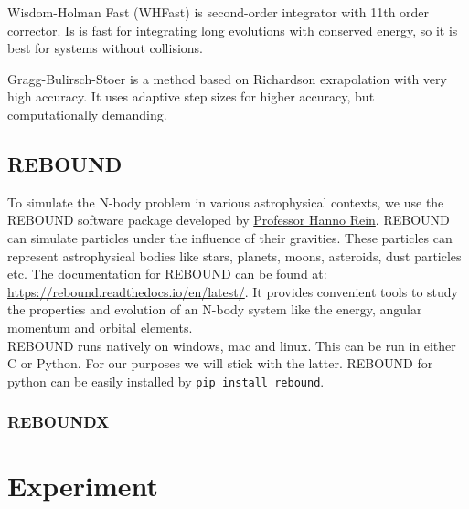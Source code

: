 \documentclass[12pt,a4paper]{article}
\begin{document}
Wisdom-Holman Fast (WHFast) is second-order integrator with 11th order corrector. Is is fast for integrating long evolutions with conserved energy, so it is best for systems without collisions.

Gragg-Bulirsch-Stoer is a method based on Richardson exrapolation with very high accuracy. It uses adaptive step sizes for higher accuracy, but computationally demanding.


\subsection{REBOUND}
To simulate the N-body problem in various astrophysical contexts, we use the REBOUND software package developed by \href{https://hanno-rein.de/}{ Professor Hanno Rein}. 
REBOUND can simulate particles under the influence of their gravities. These particles can represent astrophysical bodies like stars, planets, moons, asteroids, dust particles etc\cite{rebound}. 
The documentation for REBOUND can be found at: \href{https://rebound.readthedocs.io/en/latest/}{https://rebound.readthedocs.io/en/latest/}. It provides convenient tools to study the properties and evolution of an N-body system
like the energy, angular momentum and orbital elements. 
\\ REBOUND runs natively on windows, mac and linux. This can be run in either C or Python. For our purposes
we will stick with the latter. REBOUND for python can be easily installed by \texttt{pip install rebound}.

\subsubsection{REBOUNDX}
\section{Experiment}
\end{document}
